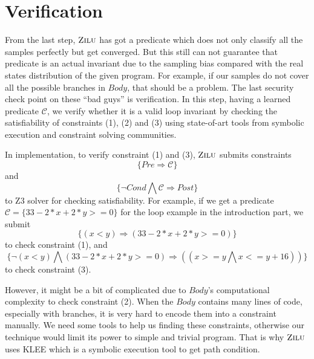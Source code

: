 
\section{Verification} %
\label{sec:verification}
From the last step, $\textsc{Zilu}$ has got a predicate which does not only classify all the samples perfectly but get converged.
But this still can not guarantee that predicate is an actual invariant due to the sampling bias compared with the real states distribution of the given program.
For example, if our samples do not cover all the possible branches in $Body$, that should be a problem.
The last security check point on these ``bad guys'' is verification. 
In this step, having a learned predicate $\mathcal{C}$, we verify whether it is a valid loop invariant by
checking the satisfiability of constraints (1), (2) and (3) using state-of-art tools from symbolic execution and constraint solving communities.

In implementation, to verify constraint (1) and (3), 
$\textsc{Zilu}$ submits constraints $$\{Pre \Rightarrow \mathcal{C}\}$$ and $$\{\neg {Cond} \bigwedge \mathcal{C} \Rightarrow Post\}$$ to Z3 solver for checking satisfiability.
For example, if we get a predicate $\mathcal{C} = \{33-2*x+2*y>=0\}$
for the loop example in the introduction part, 
we submit 
$$\{(x<y) \Rightarrow (33-2*x+2*y>=0)\}$$
to check constraint (1), 
and 
$$\{\neg(x<y) \bigwedge (33-2*x+2*y>=0) \Rightarrow ((x >= y \bigwedge x <= y + 16))\}$$
to check constraint (3).

However, it might be a bit of complicated due to $Body$'s computational complexity to check constraint (2).
When the $Body$ contains many lines of code, especially with branches, it is very hard to encode them into a constraint manually.
We need some tools to help us finding these constraints, otherwise our technique would limit its power to simple and trivial program. 
That is why $\textsc{Zilu}$ uses KLEE\cite{cadar2008klee} which is a symbolic execution tool to get path condition.





